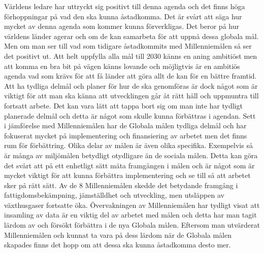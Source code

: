 \documentclass{report}
\begin{document}
Världens ledare har uttryckt sig positivt till denna agenda och det finns höga förhoppningar på vad den ska kunna åstadkomma. Det är svårt att säga hur mycket av denna agenda som kommer kunna förverkligas. Det beror på hur världens länder agerar och om de kan samarbeta för att uppnå dessa globala mål. Men om man ser till vad som tidigare åstadkommits med Millenniemålen så ser det positivt ut. Att helt uppfylla alla mål till 2030 känns en aning ambitiöst men att komma en bra bit på vägen känns lovande och möjligtvis är en ambitiös agenda vad som krävs för att få länder att göra allt de kan för en bättre framtid. Att ha tydliga delmål och planer för hur de ska genomföras är dock något som är viktigt för att man ska känna att utvecklingen går åt rätt håll och uppmuntra till fortsatt arbete. Det kan vara lätt att tappa bort sig om man inte har tydligt planerade delmål och detta är något som skulle kunna förbättras i agendan. Sett i jämförelse med Millenniemålen har de Globala målen tydliga delmål och har fokuserat mycket på implementering och finansiering av arbetet men det finns rum för förbättring. Olika delar av målen är även olika specifika. Exempelvis så är många av miljömålen betydligt otydligare än de sociala målen. Detta kan göra det svårt att på ett enhetligt sätt mäta framgången i målen och är något som är mycket viktigt för att kunna förbättra implementering och se till så att arbetet sker på rätt sätt. Av de 8 Millenniemålen skedde det betydande framgång i fattigdomsbekämpning, jämställdhet och utveckling, men utsläppen av växthusgaser fortsatte öka. Övervakningen av Millenniemålen har tydligt visat att insamling av data är en viktig del av arbetet med målen och detta har man tagit lärdom av och försökt förbättra i de nya Globala målen.\cite{Millennium} Eftersom man utvärderat Millenniemålen och kunnat ta vara på dess lärdom när de Globala målen skapades finns det hopp om att dessa ska kunna åstadkomma desto mer. \\
\end{document}
